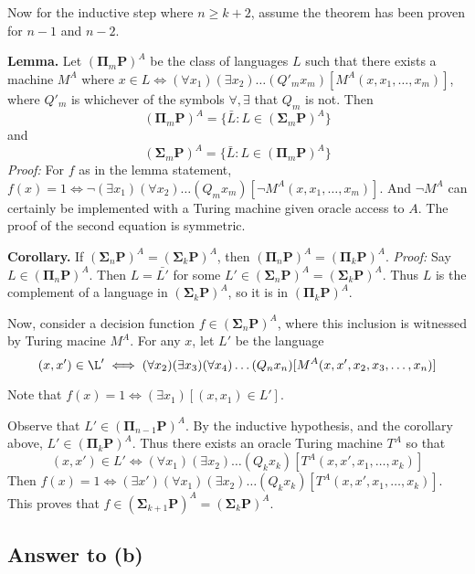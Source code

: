 \documentclass{article}
\renewcommand{\P}{\mathbf{P}}
\newcommand{\BSigma}{\mathbf{\Sigma}}
\newcommand{\BPi}{\mathbf{\Pi}}
\begin{document}
Now for the inductive step where $n \geq k + 2$, assume the theorem has been proven for $n - 1$ and $n - 2$.

\textbf{Lemma.} Let $(\BPi_m \P)^A$ be the class of languages $L$ such that there exists a machine $M^A$ where $x \in L \iff (\forall x_1) (\exists x_2) \dots (Q'_m x_m)[M^A(x, x_1, \dots, x_m)]$, where $Q'_m$ is whichever of the symbols $\forall, \exists$ that $Q_m$ is not.
Then $$
(\BPi_m \P)^A = \{\bar{L} : L \in (\BSigma_m \P)^A\}
$$ and
$$
(\BSigma_m \P)^A = \{\bar{L} : L \in (\BPi_m \P)^A\}
$$
\textit{Proof:} For $f$ as in the lemma statement, $f(x) = 1 \iff \neg (\exists x_1) (\forall x_2) \dots (Q_m x_m) [\neg M^A(x, x_1, \dots, x_m)]$.  And $\neg M^A$ can certainly be implemented with a Turing machine given oracle access to $A$.  The proof of the second equation is symmetric.

\textbf{Corollary.} If $(\BSigma_n \P)^A = (\BSigma_k \P)^A$, then $(\BPi_n \P)^A = (\BPi_k \P)^A$.
\textit{Proof:} Say $L \in (\BPi_n \P)^A$. Then $L = \bar{L'}$ for some $L' \in (\BSigma_n \P)^A = (\BSigma_k \P)^A$.  Thus $L$ is the complement of a language in $(\BSigma_k \P)^A$, so it is in $(\BPi_k \P)^A$.



Now, consider a decision function $f \in (\BSigma_n \P)^A$, where this inclusion is witnessed by Turing macine $M^A$.  For any $x$, let $L'$ be the language
$$
(x, x') \in \L' \iff (\forall x_2) (\exists x_3) (\forall x_4 ) \dots (Q_n x_n) [M^A(x, x', x_2, x_3, \dots, x_n)]
$$

Note that $f(x) = 1 \iff (\exists x_1) [(x, x_1) \in L']$.

Observe that $L' \in (\BPi_{n - 1} \P)^A$.  By the inductive hypothesis, and the corollary above, $L' \in (\BPi_k \P)^A$. Thus there exists an oracle Turing machine $T^A$ so that
$$
(x, x') \in L' \iff (\forall x_1) (\exists x_2) \dots (Q_k x_k) [T^A(x, x', x_1, \dots, x_k)]
$$
Then $f(x) = 1 \iff (\exists x')(\forall x_1) (\exists x_2) \dots (Q_k x_k) [T^A(x, x', x_1, \dots, x_k)]$.  This proves that $f \in (\BSigma_{k + 1} \P)^A = (\BSigma_k \P)^A$.

\subsection*{Answer to (b)}
\end{document}
